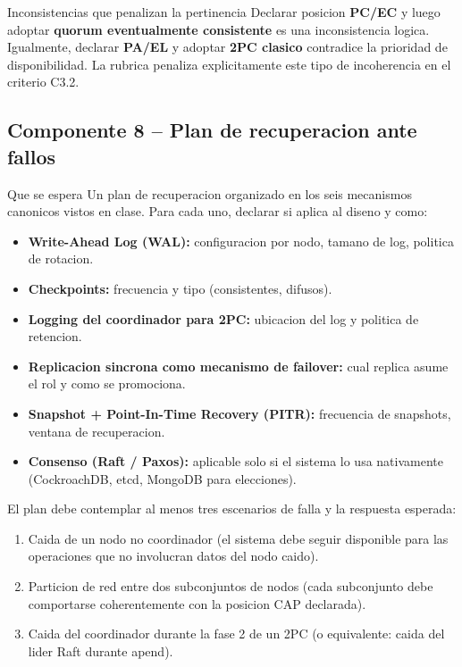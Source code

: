 \documentclass[11pt,a4paper]{article}
\begin{document}
\begin{cajacritica}{Inconsistencias que penalizan la pertinencia}
Declarar posicion \textbf{PC/EC} y luego adoptar \textbf{quorum eventualmente consistente} es una inconsistencia logica. Igualmente, declarar \textbf{PA/EL} y adoptar \textbf{2PC clasico} contradice la prioridad de disponibilidad. La rubrica penaliza explicitamente este tipo de incoherencia en el criterio C3.2.
\end{cajacritica}

\subsection{Componente 8 -- Plan de recuperacion ante fallos}

\begin{cajadefinicion}{Que se espera}
Un plan de recuperacion organizado en los seis mecanismos canonicos vistos en clase. Para cada uno, declarar si aplica al diseno y como:
\begin{itemize}
\item \textbf{Write-Ahead Log (WAL):} configuracion por nodo, tamano de log, politica de rotacion.
\item \textbf{Checkpoints:} frecuencia y tipo (consistentes, difusos).
\item \textbf{Logging del coordinador para 2PC:} ubicacion del log y politica de retencion.
\item \textbf{Replicacion sincrona como mecanismo de failover:} cual replica asume el rol y como se promociona.
\item \textbf{Snapshot + Point-In-Time Recovery (PITR):} frecuencia de snapshots, ventana de recuperacion.
\item \textbf{Consenso (Raft / Paxos):} aplicable solo si el sistema lo usa nativamente (CockroachDB, etcd, MongoDB para elecciones).
\end{itemize}
\end{cajadefinicion}

El plan debe contemplar al menos tres escenarios de falla y la respuesta esperada:
\begin{enumerate}[label=\textbf{F\arabic*:}]
\item Caida de un nodo no coordinador (el sistema debe seguir disponible para las operaciones que no involucran datos del nodo caido).
\item Particion de red entre dos subconjuntos de nodos (cada subconjunto debe comportarse coherentemente con la posicion CAP declarada).
\item Caida del coordinador durante la fase 2 de un 2PC (o equivalente: caida del lider Raft durante apend).
\end{enumerate}
\end{document}

